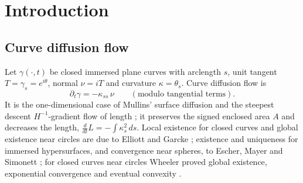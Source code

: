 \documentclass[11pt]{amsart}
\theoremstyle{definition}
\theoremstyle{remark}
\begin{document}
\section{Introduction}\label{s:intro}

\subsection{Curve diffusion flow}
Let $\gamma(\cdot,t)$ be closed immersed plane curves with arclength $s$, unit tangent $T=\gamma_s=e^{i\theta}$, normal $\nu=iT$ and curvature $\kappa=\theta_s$. Curve diffusion flow is
\begin{equation}\label{eq:cdf}
\partial_t\gamma=-\kappa_{ss}\,\nu\qquad(\text{modulo tangential terms}).
\end{equation}
It is the one-dimensional case of Mullins' surface diffusion \cite{Mullins1957} and the steepest descent $H^{-1}$-gradient flow of length \cite{Wheeler2013}; it preserves the signed enclosed area $A$ and decreases the length, $\frac{d}{dt}L=-\int\kappa_s^2\,ds$. Local existence for closed curves and global existence near circles are due to Elliott and Garcke \cite{ElliottGarcke1997}; existence and uniqueness for immersed hypersurfaces, and convergence near spheres, to Escher, Mayer and Simonett \cite{EscherMayerSimonett1998}; for closed curves near circles Wheeler proved global existence, exponential convergence and eventual convexity \cite{Wheeler2013}.
\end{document}
